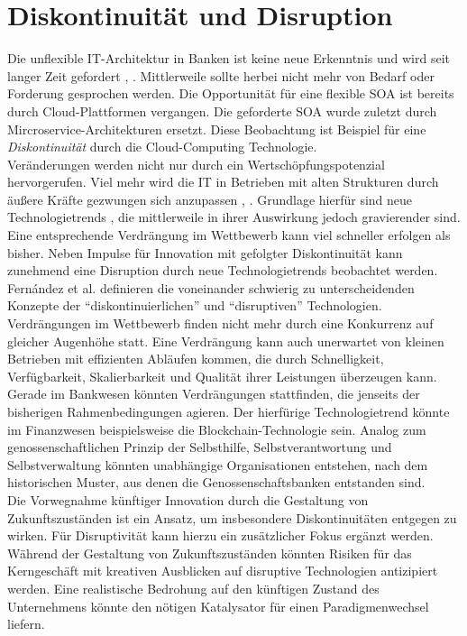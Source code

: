 \section{Diskontinuität und Disruption}
Die unflexible IT-Architektur in Banken ist keine neue Erkenntnis und wird seit langer Zeit gefordert \cite{Brockhoff2006}, \cite{Bussmann2006}. Mittlerweile sollte herbei nicht mehr von Bedarf oder Forderung gesprochen werden. Die Opportunität für eine flexible \ac{SOA} ist bereits durch Cloud-Plattformen vergangen. Die geforderte \ac{SOA} wurde zuletzt durch Mircroservice-Architekturen ersetzt. Diese Beobachtung ist Beispiel für eine \emph{Diskontinuität} durch die Cloud-Computing Technologie.
\medskip
\\
Veränderungen werden nicht nur durch ein Wertschöpfungspotenzial hervorgerufen. Viel mehr wird die IT in Betrieben mit alten Strukturen durch äußere Kräfte gezwungen sich anzupassen \cite{Alt2017}, \cite{Gupta:2017}. Grundlage hierfür sind neue Technologietrends \cite{Bussmann2006}, die mittlerweile in ihrer Auswirkung jedoch gravierender sind. Eine entsprechende Verdrängung im Wettbewerb kann viel schneller erfolgen als bisher. Neben Impulse für Innovation mit gefolgter Diskontinuität \cite{Alt2017} kann zunehmend eine Disruption durch neue Technologietrends beobachtet werden. Fernández et al. \cite{Fernandez:2020} definieren die voneinander schwierig zu unterscheidenden Konzepte der \enquote{diskontinuierlichen} und \enquote{disruptiven} Technologien.
\medskip
\\
Verdrängungen im Wettbewerb finden nicht mehr durch eine Konkurrenz auf gleicher Augenhöhe statt. Eine Verdrängung kann auch unerwartet von kleinen Betrieben mit effizienten Abläufen kommen, die durch Schnelligkeit, Verfügbarkeit, Skalierbarkeit und Qualität ihrer Leistungen überzeugen kann.  Gerade im Bankwesen könnten Verdrängungen stattfinden, die jenseits der bisherigen Rahmenbedingungen agieren. Der hierfürige Technologietrend könnte im Finanzwesen beispielsweise die Blockchain-Technologie sein. Analog zum genossenschaftlichen Prinzip der Selbsthilfe, Selbstverantwortung und Selbstverwaltung könnten unabhängige Organisationen entstehen, nach dem historischen Muster, aus denen die Genossenschaftsbanken entstanden sind.
\medskip
\\
Die Vorwegnahme künftiger Innovation durch die Gestaltung von Zukunftszuständen \cite{Alt2017} ist ein Ansatz, um insbesondere Diskontinuitäten entgegen zu wirken. 
Für Disruptivität kann hierzu ein zusätzlicher Fokus ergänzt werden. Während der Gestaltung von Zukunftszuständen könnten Risiken für das Kerngeschäft mit kreativen Ausblicken auf disruptive Technologien antizipiert werden. Eine realistische Bedrohung auf den künftigen Zustand des Unternehmens könnte den nötigen Katalysator für einen Paradigmenwechsel liefern.

